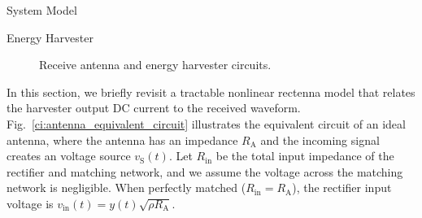 \documentclass[journal]{IEEEtran}
\begin{document}
\begin{section}{System Model}
		\begin{subsection}{Energy Harvester}
			\begin{figure}[!t]
				\centering
				\noindent
				\begin{minipage}[b]{0.45\columnwidth}
					\centering
				\end{minipage}%
				\begin{minipage}[b]{0.45\columnwidth}
					\centering
				\end{minipage}
				\caption{Receive antenna and energy harvester circuits.}
			\end{figure}

			In this section, we briefly revisit a tractable nonlinear rectenna model that relates the harvester output DC current to the received waveform. Fig.~\ref{ci:antenna_equivalent_circuit} illustrates the equivalent circuit of an ideal antenna, where the antenna has an impedance $R_{\mathrm{A}}$ and the incoming signal creates an voltage source $v_{\mathrm{S}}(t)$. Let $R_{\mathrm{in}}$ be the total input impedance of the rectifier and matching network, and we assume the voltage across the matching network is negligible. When perfectly matched ($R_{\mathrm{in}}=R_{\mathrm{A}}$), the rectifier input voltage is $v_{\mathrm{in}}(t)=y(t)\sqrt{\rho R_{\mathrm{A}}}$.


\end{subsection}
\end{section}
\end{document}
